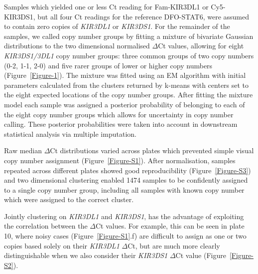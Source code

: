 Samples which yielded one or less Ct reading for Fam-KIR3DL1 or
Cy5-KIR3DS1, but all four Ct readings for the reference DFO-STAT6,
were assumed to contain zero copies of \emph{KIR3DL1} or
\emph{KIR3DS1}.  For the remainder of the samples, we called copy number groups
by fitting a mixture of bivariate Gaussian distributions to the two
dimensional normalised $\Delta$Ct values, allowing for eight
\emph{KIR3DS1/3DL1} copy number groups: three common groups of two copy
numbers (0-2, 1-1, 2-0) and five
rarer groups of lower or higher copy numbers
(Figure~\ref{Figure-1}).  The mixture was fitted using
an EM algorithm \citep{mixtools} with initial parameters
calculated from the clusters returned by k-means with centers set to
the eight expected locations of the copy number groups.
After fitting the mixture model each sample was assigned a posterior
probability of belonging to each of the eight copy number groups which
allows for uncertainty in copy number calling.  These posterior
probabilities were taken into account in downstream statistical
analysis via multiple imputation.

Raw median $\Delta$Ct distributions varied across plates which prevented simple visual copy number assignment (Figure~\ref{Figure-S1}).
After normalisation, samples repeated across different plates showed good reproducibility (Figure~\ref{Figure-S3}) and two dimensional clustering enabled 1474 samples to be confidently assigned to a single copy number group, including all samples with known copy number which were assigned to the correct cluster.

Jointly clustering on \emph{KIR3DL1} and \emph{KIR3DS1}, has the advantage of exploiting the correlation between the $\Delta$Ct values. 
For example, this can be seen in plate 10, where noisy cases (Figure~\ref{Figure-S1}.f) are difficult to assign as one or two copies based solely on their \emph{KIR3DL1} $\Delta$Ct, but are much more clearly distinguishable when we also consider their \emph{KIR3DS1} $\Delta$Ct value (Figure~\ref{Figure-S2}).



